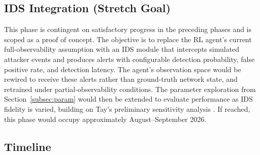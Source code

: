 \documentclass[11pt, a4paper]{article}
\begin{document}
\subsection{IDS Integration (Stretch Goal)}

This phase is contingent on satisfactory progress in the preceding phases
and is scoped as a proof of concept. The objective is to replace the RL
agent's current full-observability assumption with an IDS module that
intercepts simulated attacker events and produces alerts with configurable
detection probability, false positive rate, and detection latency.
The agent's observation space would be rewired to receive these alerts
rather than ground-truth network state, and retrained under
partial-observability conditions. The parameter exploration from
Section~\ref{subsec:param} would then be extended to evaluate performance
as IDS fidelity is varied, building on Tay's preliminary sensitivity
analysis \cite{tay2024}. If reached, this phase would occupy approximately
August--September 2026.

\subsection{Timeline}\label{subsec:timeline}
\end{document}
